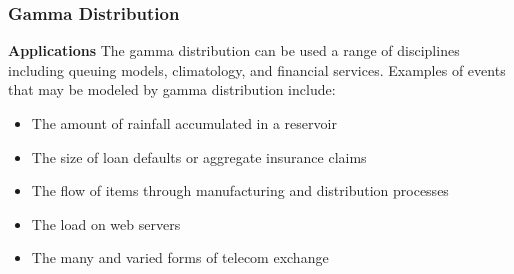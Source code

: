 \begin{frame}
\frametitle{Gamma Distribution}
\textbf{Applications}
The gamma distribution can be used a range of disciplines including queuing models, climatology, and financial services. Examples of events that may be modeled by gamma distribution include:
\begin{itemize}
\item The amount of rainfall accumulated in a reservoir
\item The size of loan defaults or aggregate insurance claims
\item The flow of items through manufacturing and distribution processes
\item The load on web servers
\item The many and varied forms of telecom exchange
\end{itemize}

\end{frame}
